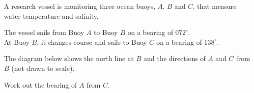 \begin{question}
\noindent A research vessel is monitoring three ocean buoys, $A$, $B$ and $C$, that measure water temperature and salinity.

\noindent The vessel sails from Buoy $A$ to Buoy $B$ on a bearing of $072^{\circ}$.\\
At Buoy $B$, it changes course and sails to Buoy $C$ on a bearing of $138^{\circ}$.

\noindent The diagram below shows the north line at $B$ and the directions of $A$ and $C$ from $B$ (not drawn to scale).

\begin{center}
\end{center}

\noindent Work out the bearing of $A$ from $C$.

\vspace{6cm}
\begin{flushright}
\end{flushright}
\end{question}
